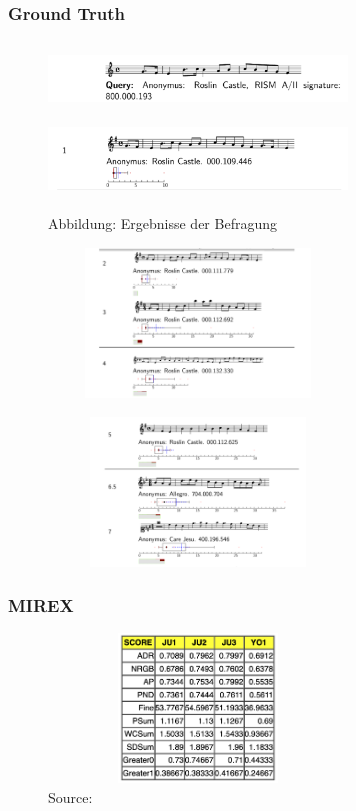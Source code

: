 \documentclass{beamer}
\begin{document}
		\begin{frame}[allowframebreaks]
			\frametitle{Ground Truth}
				\begin{figure}[h!]
					\includegraphics[width=300px,height=75px,keepaspectratio]{ground_truth_query}
					\includegraphics[width=300px,height=75px,keepaspectratio]{ground_truth_results_one}
					\caption{Abbildung: Ergebnisse der Befragung \cite{three}}
				\end{figure}
				\begin{figure}[h!]
					\includegraphics[width=300px,height=150px,keepaspectratio]{ground_truth_results_two}
				\end{figure}
				\begin{figure}[h!]
					\includegraphics[width=300px,height=150px,keepaspectratio]{ground_truth_results_three}
				\end{figure}
		\end{frame}

	\begin{frame}
		\frametitle{MIREX}
		\begin{figure}[h!]
			\includegraphics[width=300px,height=150px,keepaspectratio]{MIREX_2014_results}
			\caption{Source: \cite{mirex_website_2014_results}}
		\end{figure}
	\end{frame}
\end{document}
